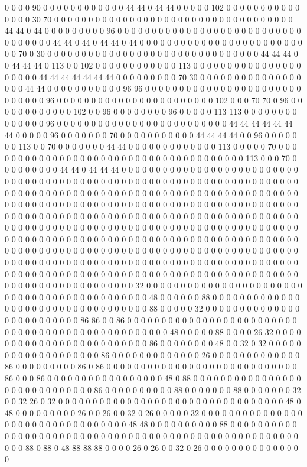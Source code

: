 0 0 0 0 90 0 0 0 0 0 0 0 0 0 0 0 0 44 44 0 44 44 0 0 0 0 0 102 0 0 0 0 0 0 0 0 0 0 0 0 0 0 0 30 70 0 0 0 0 0 0 0 0 0 0 0 0 0 0 0 0 0 0 0 0 0 0 0 0 0 0 0 0 0 0 0 0 0 0 0 44 44 0 44 0 0 0 0 0 0 0 0 0 96 0 0 0 0 0 0 0 0 0 0 0 0 0 0 0 0 0 0 0 0 0 0 0 0 0 0 0 0 0 0 0 0 0 0 44 44 0 44 0 44 44 0 44 0 0 0 0 0 0 0 0 0 0 0 0 0 0 0 0 0 0 0 0 0 0 0 0 0 0 70 0 30 0 0 0 0 0 0 0 0 0 0 0 0 0 0 0 0 0 0 0 0 0 0 0 0 0 0 0 0 0 0 0 44 44 44 0 0 44 44 44 0 113 0 0 102 0 0 0 0 0 0 0 0 0 0 0 0 113 0 0 0 0 0 0 0 0 0 0 0 0 0 0 0 0 0 0 0 0 0 44 44 44 44 44 44 44 0 0 0 0 0 0 0 0 0 70 30 0 0 0 0 0 0 0 0 0 0 0 0 0 0 0 0 0 0 44 44 0 0 0 0 0 0 0 0 0 0 0 96 96 0 0 0 0 0 0 0 0 0 0 0 0 0 0 0 0 0 0 0 0 0 0 0 0 0 0 0 0 0 96 0 0 0 0 0 0 0 0 0 0 0 0 0 0 0 0 0 0 0 0 0 0 0 102 0 0 0 70 70 0 96 0 0 0 0 0 0 0 0 0 0 0 0 102 0 0 96 0 0 0 0 0 0 0 0 96 0 0 0 0 0 113 113 0 0 0 0 0 0 0 0 0 0 0 0 0 0 96 0 0 0 0 0 0 0 0 0 0 0 0 0 0 0 0 0 0 0 0 0 0 0 0 0 44 44 44 44 44 44 44 0 0 0 0 0 96 0 0 0 0 0 0 0 70 0 0 0 0 0 0 0 0 0 0 0 44 44 44 44 0 0 96 0 0 0 0 0 0 0 113 0 0 70 0 0 0 0 0 0 0 44 44 0 0 0 0 0 0 0 0 0 0 0 0 0 113 0 0 0 0 0 70 0 0 0 0 0 0 0 0 0 0 0 0 0 0 0 0 0 0 0 0 0 0 0 0 0 0 0 0 0 0 0 0 0 0 0 0 0 0 113 0 0 0 70 0 0 0 0 0 0 0 0 0 44 44 0 44 44 44 0 0 0 0 0 0 0 0 0 0 0 0 0 0 0 0 0 0 0 0 0 0 0 0 0 0 0 0 0 0 0 0 0 0 0 0 0 0 0 0 0 0 0 0 0 0 0 0 0 0 0 0 0 0 0 0 0 0 0 0 0 0 0 0 0 0 0 0 0 0 0 0 0 0 0 0 0 0 0 0 0 0 0 0 0 0 0 0 0 0 0 0 0 0 0 0 0 0 0 0 0 0 0 0 0 0 0 0 0 0 0 0 0 0 0 0 0 0 0 0 0 0 0 0 0 0 0 0 0 0 0 0 0 0 0 0 0 0 0 0 0 0 0 0 0 0 0 0 0 0 0 0 0 0 0 0 0 0 0 0 0 0 0 0 0 0 0 0 0 0 0 0 0 0 0 0 0 0 0 0 0 0 0 0 0 0 0 0 0 0 0 0 0 0 0 0 0 0 0 0 0 0 0 0 0 0 0 0 0 0 0 0 0 0 0 0 0 0 0 0 0 0 0 0 0 0 0 0 0 0 0 0 0 0 0 0 0 0 0 0 0 0 0 0 0 0 0 0 0 0 0 0 0 0 0 0 0 0 0 0 0 0 0 0 0 0 0 0 0 0 0 0 0 0 0 0 0 0 0 0 0 0 0 0 0 0 0 0 0 0 0 0 0 0 0 0 0 0 0 0 0 0 0 0 0 0 0 0 0 0 0 0 0 0 0 0 0 0 0 0 0 0 0 0 0 0 0 0 0 0 0 0 0 0 0 0 0 0 0 0 0 0 0 0 0 0 0 0 0 0 0 0 0 0 0 0 0 0 0 0 0 0 0 0 0 0 0 0 0 0 0 0 0 0 0 0 0 0 0 0 0 0 0 0 0 0 0 0 0 0 0 0 0 0 0 0 0 0 0 0 0 0 0 0 0 0 0 0 0 0 0 0 0 0 0 0 0 0 0 0 0 0 0 0 0 0 0 0 0 0 0 0 32 0 0 0 0 0 0 0 0 0 0 0 0 0 0 0 0 0 0 0 0 0 0 0 0 0 0 0 0 0 0 0 0 0 0 0 0 0 0 0 0 0 0 0 0 48 0 0 0 0 0 0 88 0 0 0 0 0 0 0 0 0 0 0 0 0 0 0 0 0 0 0 0 0 0 0 0 0 0 0 0 0 0 0 0 0 0 88 0 0 0 0 0 32 0 0 0 0 0 0 0 0 0 0 0 0 0 0 0 0 0 0 0 0 0 0 0 0 0 86 86 0 0 86 0 0 0 0 0 0 0 0 0 0 0 0 0 0 0 0 0 0 0 0 0 0 0 0 0 0 0 0 0 0 0 0 0 0 0 0 0 0 0 0 0 0 0 0 0 0 0 0 0 48 0 0 0 0 0 88 0 0 0 0 26 32 0 0 0 0 0 0 0 0 0 0 0 0 0 0 0 0 0 0 0 0 0 0 0 0 0 86 0 0 0 0 0 0 0 0 48 0 0 32 0 32 0 0 0 0 0 0 0 0 0 0 0 0 0 0 0 0 0 0 0 86 0 0 0 0 0 0 0 0 0 0 0 0 0 26 0 0 0 0 0 0 0 0 0 0 0 0 0 86 0 0 0 0 0 0 0 0 0 86 0 86 0 0 0 0 0 0 0 0 0 0 0 0 0 0 0 0 0 0 0 0 0 0 0 0 0 0 0 0 86 0 0 0 86 0 0 0 0 0 0 0 0 0 0 0 0 0 0 0 0 0 48 0 88 0 0 0 0 0 0 0 0 0 0 0 0 0 0 0 0 0 0 0 0 0 0 0 0 0 0 0 0 0 86 0 0 0 0 0 0 0 0 0 0 88 0 0 0 0 0 0 0 88 0 0 0 0 0 0 0 32 0 0 32 26 0 32 0 0 0 0 0 0 0 0 0 0 0 0 0 0 0 0 0 0 0 0 0 0 0 0 0 0 0 0 0 0 0 0 0 48 0 48 0 0 0 0 0 0 0 0 0 26 0 0 26 0 0 32 0 26 0 0 0 0 0 32 0 0 0 0 0 0 0 0 0 0 0 0 0 0 0 0 0 0 0 0 0 0 0 0 0 0 0 0 0 0 0 0 0 48 48 0 0 0 0 0 0 0 0 0 0 88 0 0 0 0 0 0 0 0 0 0 0 0 0 0 0 0 0 0 0 0 0 0 0 0 0 0 0 0 0 0 0 0 0 0 0 0 0 0 0 0 0 0 0 0 0 0 0 0 0 0 0 0 0 0 0 0 88 0 88 0 48 88 88 88 0 0 0 0 26 0 26 0 0 32 0 26 0 0 0 0 0 0 0 0 0 0 0 0 0 0 0 